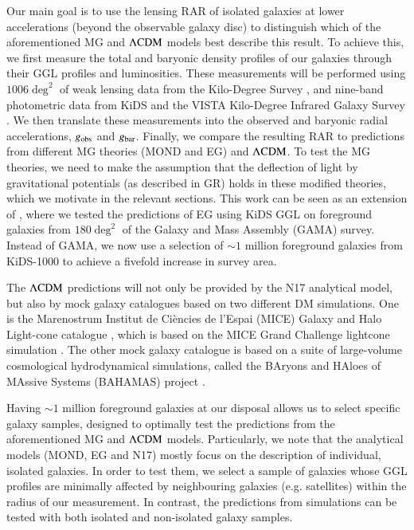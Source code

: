 \documentclass{aa}
\newcommand{\lcdm}{{\rm \Lambda CDM}}
\newcommand{\un}[1]{_{\rm #1}}
\begin{document}
Our main goal is to use the lensing RAR of isolated galaxies at lower accelerations (beyond the observable galaxy disc) to distinguish which of the aforementioned MG and $\lcdm$ models best describe this result. To achieve this, we first measure the total and baryonic density profiles of our galaxies through their GGL profiles and luminosities. These measurements will be performed using $1006 \deg^2$ of weak lensing data from the Kilo-Degree Survey \cite[KiDS-1000;][]{dejong2013,kuijken2019}, and nine-band photometric data from KiDS and the VISTA Kilo-Degree Infrared Galaxy Survey \cite[VIKING]{edge2013}. We then translate these measurements into the observed and baryonic radial accelerations, $g\un{obs}$ and $g\un{bar}$. Finally, we compare the resulting RAR to predictions from different MG theories (MOND and EG) and $\lcdm$. To test the MG theories, we need to make the assumption that the deflection of light by gravitational potentials (as described in GR) holds in these modified theories, which we motivate in the relevant sections. This work can be seen as an extension of \cite{brouwer2017}, where we tested the predictions of EG using KiDS GGL on foreground galaxies from $180 \deg^2$ of the Galaxy and Mass Assembly (GAMA) survey. Instead of GAMA, we now use a selection of $\sim1$ million foreground galaxies from KiDS-1000 to achieve a fivefold increase in survey area.

The $\lcdm$ predictions will not only be provided by the N17 analytical model, but also by mock galaxy catalogues based on two different DM simulations. One is the Marenostrum Institut de Ci{\`e}ncies de l'Espai (MICE) Galaxy and Halo Light-cone catalogue \cite[]{carretero2015,hoffmann2015}, which is based on the MICE Grand Challenge lightcone simulation \cite[]{fosalba2015b,fosalba2015a,crocce2015}. The other mock galaxy catalogue is based on a suite of large-volume cosmological hydrodynamical simulations, called the BAryons and HAloes of MAssive Systems (BAHAMAS) project \cite[]{mccarthy2017}.

Having $\sim1$ million foreground galaxies at our disposal allows us to select specific galaxy samples, designed to optimally test the predictions from the aforementioned MG and $\lcdm$ models. Particularly, we note that the analytical models (MOND, EG and N17) mostly focus on the description of individual, isolated galaxies. In order to test them, we select a sample of galaxies whose GGL profiles are minimally affected by neighbouring galaxies (e.g. satellites) within the radius of our measurement. In contrast, the predictions from simulations can be tested with both isolated and non-isolated galaxy samples.
\end{document}
